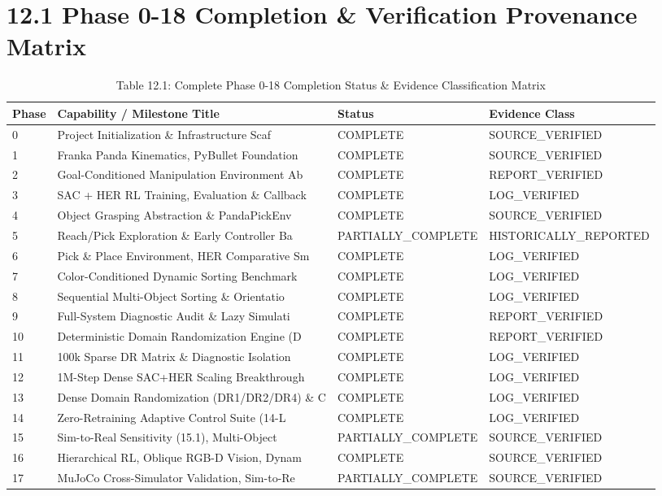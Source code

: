 \documentclass[11pt,a4paper,oneside]{book}
\begin{document}
\section{12.1 Phase 0-18 Completion \& Verification Provenance Matrix}
\begin{longtable}{l l l l}\caption{Table 12.1: Complete Phase 0-18 Completion Status \& Evidence Classification Matrix}\\\toprule
Phase & Capability / Milestone Title & Status & Evidence Class \\ \midrule \endhead
0 & Project Initialization \& Infrastructure Scaf & COMPLETE & SOURCE\_VERIFIED \\
1 & Franka Panda Kinematics, PyBullet Foundation & COMPLETE & SOURCE\_VERIFIED \\
2 & Goal-Conditioned Manipulation Environment Ab & COMPLETE & REPORT\_VERIFIED \\
3 & SAC + HER RL Training, Evaluation \& Callback & COMPLETE & LOG\_VERIFIED \\
4 & Object Grasping Abstraction \& PandaPickEnv & COMPLETE & SOURCE\_VERIFIED \\
5 & Reach/Pick Exploration \& Early Controller Ba & PARTIALLY\_COMPLETE & HISTORICALLY\_REPORTED \\
6 & Pick \& Place Environment, HER Comparative Sm & COMPLETE & LOG\_VERIFIED \\
7 & Color-Conditioned Dynamic Sorting Benchmark  & COMPLETE & LOG\_VERIFIED \\
8 & Sequential Multi-Object Sorting \& Orientatio & COMPLETE & LOG\_VERIFIED \\
9 & Full-System Diagnostic Audit \& Lazy Simulati & COMPLETE & REPORT\_VERIFIED \\
10 & Deterministic Domain Randomization Engine (D & COMPLETE & REPORT\_VERIFIED \\
11 & 100k Sparse DR Matrix \& Diagnostic Isolation & COMPLETE & LOG\_VERIFIED \\
12 & 1M-Step Dense SAC+HER Scaling Breakthrough & COMPLETE & LOG\_VERIFIED \\
13 & Dense Domain Randomization (DR1/DR2/DR4) \& C & COMPLETE & LOG\_VERIFIED \\
14 & Zero-Retraining Adaptive Control Suite (14-L & COMPLETE & LOG\_VERIFIED \\
15 & Sim-to-Real Sensitivity (15.1), Multi-Object & PARTIALLY\_COMPLETE & SOURCE\_VERIFIED \\
16 & Hierarchical RL, Oblique RGB-D Vision, Dynam & COMPLETE & SOURCE\_VERIFIED \\
17 & MuJoCo Cross-Simulator Validation, Sim-to-Re & PARTIALLY\_COMPLETE & SOURCE\_VERIFIED \\
\bottomrule \end{longtable}
\end{document}
